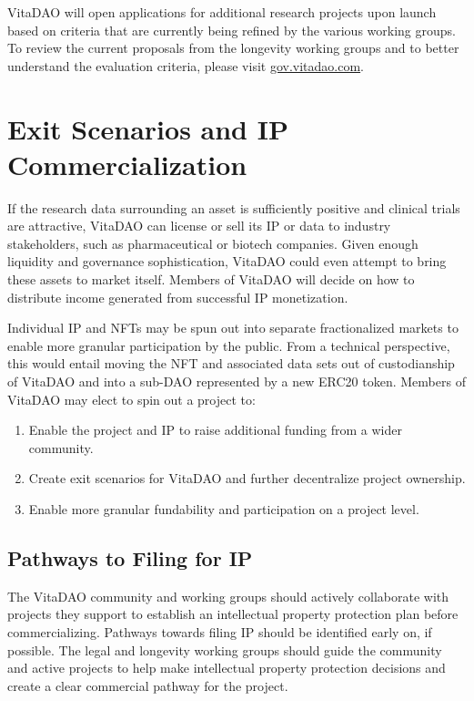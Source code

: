 \documentclass[12pt,letterpaper]{article}
\begin{document}
VitaDAO will open applications for additional research projects upon launch based on criteria that are currently being refined by the various working groups. To review the current proposals from the longevity working groups and to better understand the evaluation criteria, please visit \url{gov.vitadao.com}.

\section{Exit Scenarios and IP Commercialization}
If the research data surrounding an asset is sufficiently positive and clinical trials are attractive, VitaDAO can license or sell its IP or data to industry stakeholders, such as pharmaceutical or biotech companies. Given enough liquidity and governance sophistication, VitaDAO could even attempt to bring these assets to market itself. Members of VitaDAO will decide on how to distribute income generated from successful IP monetization. 

Individual IP and NFTs may be spun out into separate fractionalized markets to enable more granular participation by the public. From a technical perspective, this would entail moving the NFT and associated data sets out of custodianship of VitaDAO and into a sub-DAO represented by a new ERC20 token. Members of VitaDAO may elect to spin out a project to:

\begin{enumerate}
\item Enable the project and IP to raise additional funding from a wider community.
\item Create exit scenarios for VitaDAO and further decentralize project ownership.
\item Enable more granular fundability and participation on a project level.
\end{enumerate}

\subsection{Pathways to Filing for IP}
The VitaDAO community and working groups should actively collaborate with projects they support to establish an intellectual property protection plan before commercializing. Pathways towards filing IP should be identified early on, if possible. The legal and longevity working groups should guide the community and active projects to help make intellectual property protection decisions and create a clear commercial pathway for the project.
\end{document}
